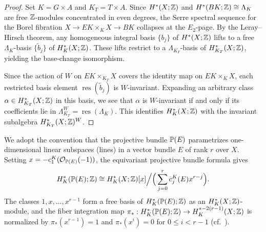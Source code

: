 \begin{proof}
Set $K = G \times A$ and $K_T = T \times A$.
Since $H^*(X;\mathbb Z)$ and $H^*(BK;\mathbb Z) \cong \Lambda_K$ are free $\mathbb Z$-modules
concentrated in even degrees, the Serre spectral sequence for the Borel fibration
$X \to EK \times_K X \to BK$ collapses at the $E_2$-page.
By the Leray--Hirsch theorem, any homogeneous integral basis $\{b_j\}$ of $H^*(X;\mathbb Z)$
lifts to a free $\Lambda_K$-basis $\{\widetilde b_j\}$ of $H_K^*(X;\mathbb Z)$.
These lifts restrict to a $\Lambda_{K_T}$-basis of $H_{K_T}^*(X;\mathbb Z)$,
yielding the base-change isomorphism.

Since the action of $W$ on $EK \times_{K_T} X$ covers the identity map on $EK \times_K X$,
each restricted basis element $\operatorname{res}(\widetilde b_j)$ is $W$-invariant.
Expanding an arbitrary class $\alpha \in H_{K_T}^*(X;\mathbb Z)$ in this basis, we see that $\alpha$
is $W$-invariant if and only if its coefficients lie in
$\Lambda_{K_T}^W = \operatorname{res}(\Lambda_K)$.
This identifies $H_K^*(X;\mathbb Z)$ with the invariant subalgebra $H_{K_T}^*(X;\mathbb Z)^W$.
\end{proof}

We adopt the convention that the projective bundle $\mathbb P(E)$ parametrizes one-dimensional
linear subspaces (lines) in a vector bundle $E$ of rank $r$ over $X$.
Setting $x = -c_1^K(\mathcal O_{\mathbb P(E)}(-1))$, the equivariant projective bundle formula gives
\begin{equation}\label{eq:projective_bundle_formula}
 H_K^*(\mathbb P(E);\mathbb Z) \cong
 H_K^*(X;\mathbb Z)[x]\Big/\Big(\sum_{j=0}^r c_j^K(E)x^{r-j}\Big).
\end{equation}
The classes $1, x, \dots, x^{r-1}$ form a free basis of $H_K^*(\mathbb P(E);\mathbb Z)$ as an
$H_K^*(X;\mathbb Z)$-module, and the fiber integration map $\pi_*:H_K^*(\mathbb P(E);\mathbb Z)\to H_K^{*-2(r-1)}(X;\mathbb Z)$
is normalized by $\pi_*(x^{r-1}) = 1$ and $\pi_*(x^i) = 0$ for $0\leq i < r-1$
(cf.\ \cite[Proposition~2.6.1]{anderson2024equivariant}).
